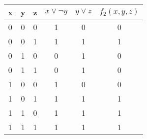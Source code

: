 \documentclass[svgnames,11pt]{beamer}
\begin{document}
\begin{frame}
    \frametitle{}

    \begin{center}
        \begin{tabular}{|*6{c|}}
            \hline
            x & y & z & $x \lor \lnot y$ & $y \lor z$ & $f_2(x,y,z)$ \\
            \hline
            0 & 0 & 0 & 1                & 0          & 0            \\
            \hline
            0 & 0 & 1 & 1                & 1          & 1            \\
            \hline
            0 & 1 & 0 & 0                & 1          & 0            \\
            \hline
            0 & 1 & 1 & 0                & 1          & 0            \\
            \hline
            1 & 0 & 0 & 1                & 0          & 0            \\
            \hline
            1 & 0 & 1 & 1                & 1          & 1            \\
            \hline
            1 & 1 & 0 & 1                & 1          & 1            \\
            \hline
            1 & 1 & 1 & 1                & 1          & 1            \\
            \hline
        \end{tabular}
    \end{center}

\end{frame}
\end{document}
